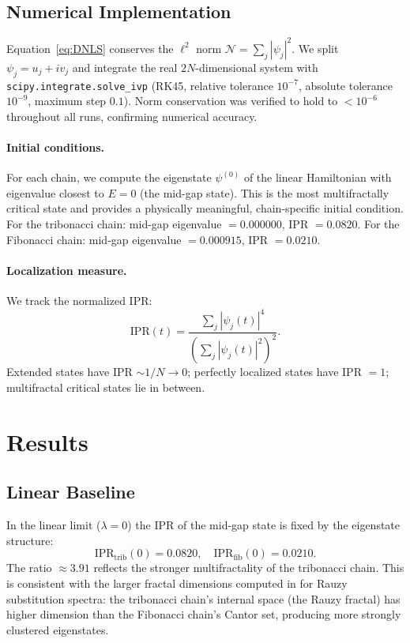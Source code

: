 \documentclass[12pt,a4paper]{article}
\begin{document}
\subsection{Numerical Implementation}

Equation~\eqref{eq:DNLS} conserves the $\ell^2$ norm
$\mathcal{N} = \sum_j |\psi_j|^2$. We split $\psi_j = u_j + iv_j$ and
integrate the real $2N$-dimensional system with \texttt{scipy.integrate.solve\_ivp}
(RK45, relative tolerance $10^{-7}$, absolute tolerance $10^{-9}$, maximum
step $0.1$). Norm conservation was verified to hold to $< 10^{-6}$ throughout
all runs, confirming numerical accuracy.

\paragraph{Initial conditions.} For each chain, we compute the eigenstate
$\psi^{(0)}$ of the linear Hamiltonian with eigenvalue closest to $E = 0$
(the mid-gap state). This is the most multifractally critical state and
provides a physically meaningful, chain-specific initial condition.
For the tribonacci chain: mid-gap eigenvalue $= 0.000000$, IPR $= 0.0820$.
For the Fibonacci chain: mid-gap eigenvalue $= 0.000915$, IPR $= 0.0210$.

\paragraph{Localization measure.} We track the normalized IPR:
\[
  \mathrm{IPR}(t) = \frac{\sum_j |\psi_j(t)|^4}{\left(\sum_j |\psi_j(t)|^2\right)^2}.
\]
Extended states have IPR $\sim 1/N \to 0$; perfectly localized states have
IPR $= 1$; multifractal critical states lie in between.

\section{Results}

\subsection{Linear Baseline}

In the linear limit ($\lambda = 0$) the IPR of the mid-gap state is fixed by
the eigenstate structure:
\[
  \mathrm{IPR}_{\mathrm{trib}}(0) = 0.0820, \quad
  \mathrm{IPR}_{\mathrm{fib}}(0) = 0.0210.
\]
The ratio $\approx 3.91$ reflects the stronger multifractality of the
tribonacci chain. This is consistent with the larger fractal dimensions
computed in \cite{Krebbekx2023} for Rauzy substitution spectra: the tribonacci
chain's internal space (the Rauzy fractal) has higher dimension than the
Fibonacci chain's Cantor set, producing more strongly clustered eigenstates.
\end{document}
